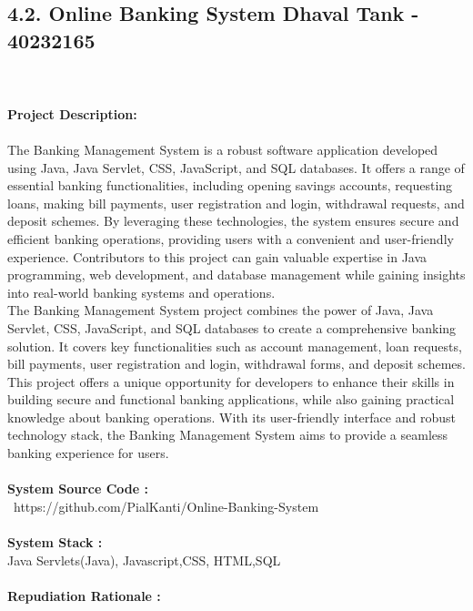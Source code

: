 \documentclass[letterpaper, 11pt]{report}
\begin{document}
\pagebreak
{}
\subsection*{4.2. Online Banking System\hfill {\normalsize{ Dhaval Tank - 40232165 }}} \\
\\
\normalsize {\textbf{Project Description:}} \\
\\
\normalsize {The Banking Management System is a robust software application developed using Java, Java Servlet, CSS, JavaScript, and SQL databases. It offers a range of essential banking functionalities, including opening savings accounts, requesting loans, making bill payments, user registration and login, withdrawal requests, and deposit schemes. By leveraging these technologies, the system ensures secure and efficient banking operations, providing users with a convenient and user-friendly experience. Contributors to this project can gain valuable expertise in Java programming, web development, and database management while gaining insights into real-world banking systems and operations.
\\

The Banking Management System project combines the power of Java, Java Servlet, CSS, JavaScript, and SQL databases to create a comprehensive banking solution. It covers key functionalities such as account management, loan requests, bill payments, user registration and login, withdrawal forms, and deposit schemes. This project offers a unique opportunity for developers to enhance their skills in building secure and functional banking applications, while also gaining practical knowledge about banking operations. With its user-friendly interface and robust technology stack, the Banking Management System aims to provide a seamless banking experience for users.}\\
\\
\normalsize{\textbf{System Source Code :}} \\
\normalsize{\ https://github.com/PialKanti/Online-Banking-System }\\
\\
\normalsize{\textbf{System Stack :}}\\
\normalsize{Java Servlets(Java), Javascript,CSS, HTML,SQL }\\
\\
\normalsize{\textbf{Repudiation Rationale : }}
\\
\end{document}
